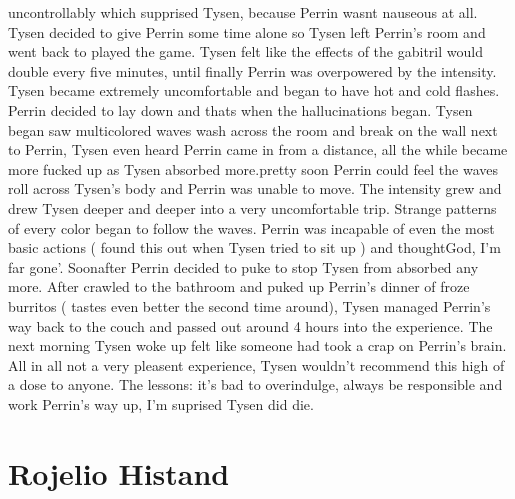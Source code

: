 \documentclass[12pt]{book}
\begin{document}
uncontrollably which supprised Tysen, because Perrin wasnt nauseous at all. Tysen decided to give Perrin some time alone so Tysen left Perrin's room and went back to played the game. Tysen felt like the effects of the gabitril would double every five minutes, until finally Perrin was overpowered by the intensity. Tysen became extremely uncomfortable and began to have hot and cold flashes. Perrin decided to lay down and thats when the hallucinations began. Tysen began saw multicolored waves wash across the room and break on the wall next to Perrin, Tysen even heard Perrin came in from a distance, all the while became more fucked up as Tysen absorbed more.pretty soon Perrin could feel the waves roll across Tysen's body and Perrin was unable to move. The intensity grew and drew Tysen deeper and deeper into a very uncomfortable trip. Strange patterns of every color began to follow the waves. Perrin was incapable of even the most basic actions ( found this out when Tysen tried to sit up ) and thoughtGod, I'm far gone'. Soonafter Perrin decided to puke to stop Tysen from absorbed any more. After crawled to the bathroom and puked up Perrin's dinner of froze burritos ( tastes even better the second time around), Tysen managed Perrin's way back to the couch and passed out around 4 hours into the experience. The next morning Tysen woke up felt like someone had took a crap on Perrin's brain. All in all not a very pleasent experience, Tysen wouldn't recommend this high of a dose to anyone. The lessons: it's bad to overindulge, always be responsible and work Perrin's way up, I'm suprised Tysen did die.



\chapter{Rojelio Histand}
\end{document}
